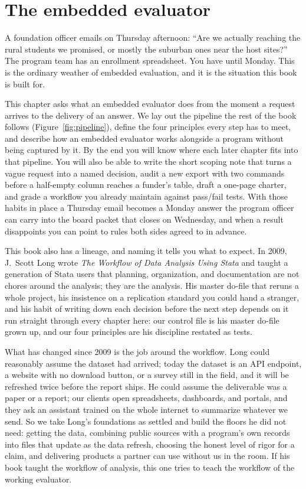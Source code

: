 \chapter{The embedded evaluator}\label{ch:embedded}

A foundation officer emails on Thursday afternoon: \enquote{Are we actually reaching the rural students we promised, or mostly the suburban ones near the host sites?} The program team has an enrollment spreadsheet. You have until Monday. This is the ordinary weather of embedded evaluation, and it is the situation this book is built for.

This chapter asks what an embedded evaluator does from the moment a request arrives to the delivery of an answer. We lay out the pipeline the rest of the book follows (Figure~\ref{fig:pipeline}), define the four principles every step has to meet, and describe how an embedded evaluator works alongside a program without being captured by it. By the end you will know where each later chapter fits into that pipeline. You will also be able to write the short scoping note that turns a vague request into a named decision, audit a new export with two commands before a half-empty column reaches a funder's table, draft a one-page charter, and grade a workflow you already maintain against pass\slash fail tests. With those habits in place a Thursday email becomes a Monday answer the program officer can carry into the board packet that closes on Wednesday, and when a result disappoints you can point to rules both sides agreed to in advance.

This book also has a lineage, and naming it tells you what to expect. In 2009, J.\ Scott Long wrote \emph{The Workflow of Data Analysis Using Stata} \parencite{long2009workflow} and taught a generation of Stata users that planning, organization, and documentation are not chores around the analysis; they are the analysis. His master do-file that reruns a whole project, his insistence on a replication standard you could hand a stranger, and his habit of writing down each decision before the next step depends on it run straight through every chapter here: our control file is his master do-file grown up, and our four principles are his discipline restated as tests.

What has changed since 2009 is the job around the workflow. Long could reasonably assume the dataset had arrived; today the dataset is an API endpoint, a website with no download button, or a survey still in the field, and it will be refreshed twice before the report ships. He could assume the deliverable was a paper or a report; our clients open spreadsheets, dashboards, and portals, and they ask an assistant trained on the whole internet to summarize whatever we send. So we take Long's foundations as settled and build the floors he did not need: getting the data, combining public sources with a program's own records into files that update as the data refresh, choosing the honest level of rigor for a claim, and delivering products a partner can use without us in the room. If his book taught the workflow of analysis, this one tries to teach the workflow of the working evaluator.

